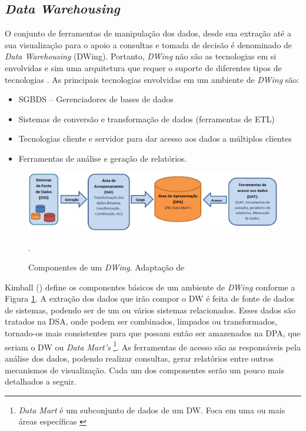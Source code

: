 \subsection{\emph{Data Warehousing}}

O conjunto de ferramentas de manipulação dos dados, desde sua extração até a sua visualização para o apoio a consultas e tomada de decisão é denominado de \emph{Data Warehousing} (DWing). Portanto,  \emph{DWing} não são as tecnologias em si envolvidas e sim uma arquitetura que requer o suporte de diferentes tipos de tecnologias \cite{inmon2002}.  As principais tecnologias envolvidas em um ambiente de \emph{DWing} são:


\begin{itemize}
\item SGBDS – Gerenciadores de bases de dados
\item Sistemas de conversão e transformação de dados (ferramentas de ETL)
\item Tecnologias cliente e servidor para dar acesso aos dados a múltiplos clientes
\item Ferramentas de análise e geração de relatórios.
\end{itemize}


 \begin{figure}[H]
 	\centering
 		\includegraphics[scale=0.5]{figuras/componentesDW}
 		\caption{Componentes de um \emph{DWing}. Adaptação de \cite{kimball2002}}.
 		\label{componentesdw}
 \end{figure}

Kimball (\citeyear{kimball2002}) define os componentes básicos de um ambiente de \emph{DWing} conforme a Figura \ref{componentesdw}. A extração dos dados que irão compor o DW é feita de fonte de dados de sistemas, podendo ser de um ou vários sistemas relacionados. Esses dados são tratados na DSA, onde podem ser combinados, limpados ou transformados, tornado-os mais consistentes para que possam então ser amazenados na DPA, que seriam o DW ou \emph{Data Mart's}
 \footnote{\emph{Data Mart} é um subconjunto de dados de um DW. Foca em uma ou mais áreas específicas \cite{kimball2002}}. 
 As ferramentas de acesso são as responsáveis pela análise dos dados, podendo realizar consultas, gerar relatórios entre outros mecanismos de visualização. Cada um dos componentes serão um pouco mais detalhados a seguir.

